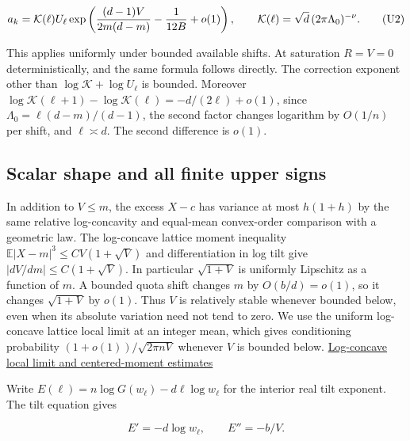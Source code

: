\begin{equation}
a_k=\mathcal K(\ell) U_\ell
\exp\left(\frac{(d-1)V}{2m(d-m)}-\frac1{12B}+o(1)\right),
\qquad
\mathcal K(\ell)=\sqrt d\thinspace(2\pi\Lambda_0)^{-\nu}.
\tag{U2}
\end{equation}

This applies uniformly under bounded available shifts. At saturation $R=V=0$ deterministically, and the same formula follows directly. The correction exponent other than $\log\mathcal K+\log U_\ell$ is bounded. Moreover $\log\mathcal K(\ell+1)-\log\mathcal K(\ell)=-d/(2\ell)+o(1)$, since $\Lambda_0=\ell(d-m)/(d-1)$, the second factor changes logarithm by $O(1/n)$ per shift, and $\ell\asymp d$. The second difference is $o(1)$.

\subsection{Scalar shape and all finite upper signs}

In addition to $V\le m$, the excess $X-c$ has variance at most $h(1+h)$ by the same relative log-concavity and equal-mean convex-order comparison with a geometric law. The log-concave lattice moment inequality $\mathbb E|X-m|^3\le CV(1+\sqrt V)$ and differentiation in log tilt give $|dV/dm|\le C(1+\sqrt V)$. In particular $\sqrt{1+V}$ is uniformly Lipschitz as a function of $m$. A bounded quota shift changes $m$ by $O(b/d)=o(1)$, so it changes $\sqrt{1+V}$ by $o(1)$. Thus $V$ is relatively stable whenever bounded below, even when its absolute variation need not tend to zero. We use the uniform log-concave lattice local limit at an integer mean, which gives conditioning probability $(1+o(1))/\sqrt{2\pi nV}$ whenever $V$ is bounded below. \href{https://github.com/ProgramComputer/open-math-research/blob/78e9ef2c0c0b7a5daed126efbe12a46d030d8200/topics/balanced-arrays/fifth-thirds/subquadratic-scaling-corank-upper.md#scalar-limits-and-stability-at-quota-shifts}{Log-concave local limit and centered-moment estimates}

Write $E(\ell)=n\log G(w_\ell)-d\ell\log w_\ell$ for the interior real tilt exponent. The tilt equation gives

\begin{equation*}
E'=-d\log w_\ell,\qquad E''=-b/V.
\end{equation*}

